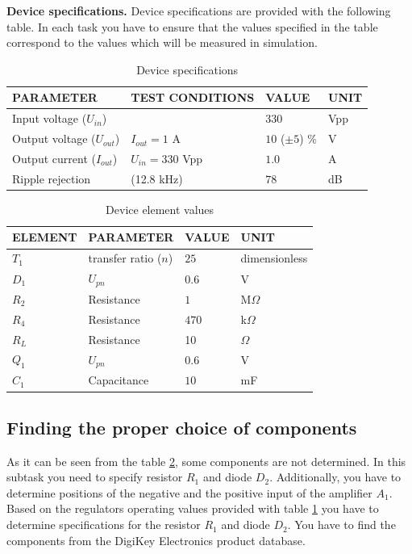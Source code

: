 \documentclass{article}
\begin{document}
\textbf{Device specifications.} Device specifications are provided with 
the following table. In each task you have to ensure that the values specified
in the table correspond to the values which will be measured in simulation. 

\begin{table}[h!]
	\caption{Device specifications}
	\label{tab:spec}
	\begin{tabularx}{\linewidth}{|X|X|X|X|} \hline
		PARAMETER & TEST CONDITIONS & VALUE & UNIT \\ \hline
		Input voltage ($U_{in}$)&  & $330$ & Vpp \\ \hline 
		Output voltage ($U_{out}$)& $I_{out} = 1$ A & $10$ ($\pm5$) \% & V \\ 
		\hline
		Output current ($I_{out}$) & $U_{in} = 330$ Vpp & $1.0$ & A \\ \hline
		Ripple rejection & (12.8 kHz) & $78$ & dB \\ \hline
	\end{tabularx}
\end{table}

\begin{table}[h!]
	\caption{Device element values}
	\label{tab:elems}
	\begin{tabularx}{\linewidth}{|X|X|X|X|} \hline
		ELEMENT & PARAMETER & VALUE & UNIT \\ \hline
		$T_1$ & transfer ratio ($n$) & $25$ &  dimensionless \\ \hline
		$D_1$ & $U_{pn}$ & $0.6$ & V \\ \hline 
		$R_2$ & Resistance & $1$ & M$\Omega$ \\ \hline
		$R_4$ & Resistance & $470$ & k$\Omega$ \\ \hline
		$R_L$ & Resistance & 10 & $\Omega$ \\ \hline
		$Q_1$ & $U_{pn}$ & $0.6$ & V \\ \hline
		$C_1$ & Capacitance & $10$ & mF \\ \hline
	\end{tabularx}
\end{table}

\newpage

\subsection{Finding the proper choice of components}
\label{ele:task:1}
As it can be seen from the table \ref{tab:elems}, some components are not 
determined. In this subtask you need to specify resistor $R_1$ and diode $D_2$. 
Additionally, you have to determine positions of the negative and the positive 
input of the amplifier $A_1$. Based on the regulators operating values 
provided with table \ref{tab:spec} you have to determine specifications for 
the resistor $R_1$ and diode $D_2$. You have to find the components from the 
DigiKey Electronics product database. 
\end{document}
